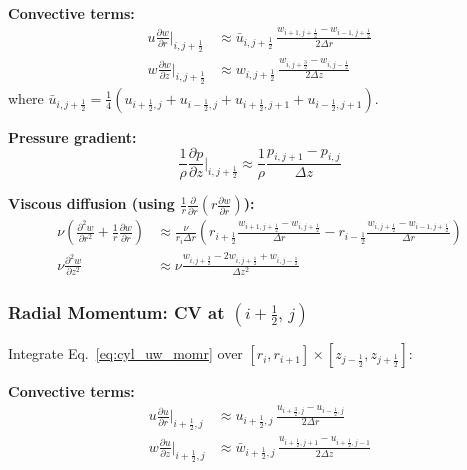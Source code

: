 \textbf{Convective terms:}
\begin{align}
    u\frac{\partial w}{\partial r}\bigg|_{i,j+\frac{1}{2}}
    &\approx \bar{u}_{i,j+\frac{1}{2}}\,
      \frac{w_{i+1,j+\frac{1}{2}}-w_{i-1,j+\frac{1}{2}}}{2\Delta r}
    \\[4pt]
    w\frac{\partial w}{\partial z}\bigg|_{i,j+\frac{1}{2}}
    &\approx w_{i,j+\frac{1}{2}}\,
      \frac{w_{i,j+\frac{3}{2}}-w_{i,j-\frac{1}{2}}}{2\Delta z}
\end{align}
where $\bar{u}_{i,j+\frac{1}{2}}
= \tfrac{1}{4}(u_{i+\frac{1}{2},j}+u_{i-\frac{1}{2},j}
              +u_{i+\frac{1}{2},j+1}+u_{i-\frac{1}{2},j+1})$.

\textbf{Pressure gradient:}
\begin{equation}
    \frac{1}{\rho}\frac{\partial p}{\partial z}\bigg|_{i,j+\frac{1}{2}}
    \approx \frac{1}{\rho}\frac{p_{i,j+1}-p_{i,j}}{\Delta z}
\end{equation}

\textbf{Viscous diffusion (using $\frac{1}{r}\frac{\partial}{\partial r}(r\frac{\partial w}{\partial r})$):}
\begin{align}
    \nu\!\left(\frac{\partial^2 w}{\partial r^2}+\frac{1}{r}\frac{\partial w}{\partial r}\right)
    &\approx \frac{\nu}{r_i\Delta r}\left(
       r_{i+\frac{1}{2}}\frac{w_{i+1,j+\frac{1}{2}}-w_{i,j+\frac{1}{2}}}{\Delta r}
      -r_{i-\frac{1}{2}}\frac{w_{i,j+\frac{1}{2}}-w_{i-1,j+\frac{1}{2}}}{\Delta r}
    \right)
    \\[4pt]
    \nu\frac{\partial^2 w}{\partial z^2}
    &\approx \nu\frac{w_{i,j+\frac{3}{2}}-2w_{i,j+\frac{1}{2}}+w_{i,j-\frac{1}{2}}}{\Delta z^2}
\end{align}

\subsubsection{Radial Momentum: CV at $(i+\tfrac{1}{2},\,j)$}

Integrate Eq.~\eqref{eq:cyl_uw_momr} over $[r_i,r_{i+1}]\times[z_{j-\frac{1}{2}},z_{j+\frac{1}{2}}]$:

\textbf{Convective terms:}
\begin{align}
    u\frac{\partial u}{\partial r}\bigg|_{i+\frac{1}{2},j}
    &\approx u_{i+\frac{1}{2},j}\,
      \frac{u_{i+\frac{3}{2},j}-u_{i-\frac{1}{2},j}}{2\Delta r}
    \\[4pt]
    w\frac{\partial u}{\partial z}\bigg|_{i+\frac{1}{2},j}
    &\approx \bar{w}_{i+\frac{1}{2},j}\,
      \frac{u_{i+\frac{1}{2},j+1}-u_{i+\frac{1}{2},j-1}}{2\Delta z}
\end{align}

